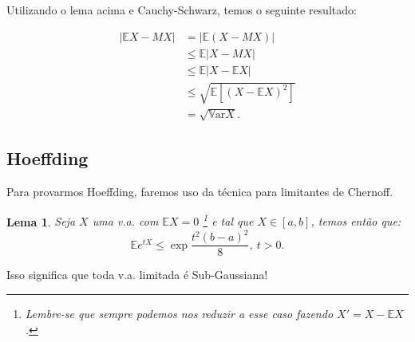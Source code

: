 \documentclass[12pt,a4paper,oneside]{book}
\newtheorem{lemma}[theorem]{Lema}
\theoremstyle{definition}
\theoremstyle{remark}
\numberwithin{equation}{section}
\newcommand{\E}{\mathbb{E}}
\newcommand{\Var}{\mathbb{V}\text{ar}}
\begin{document}
Utilizando o lema acima e Cauchy-Schwarz, temos o seguinte resultado:
\begin{tcolorbox}
\begin{align*}
|\E X- MX| & = |\E(X-MX)|\\
 &\leq \E|X-MX|\\
		&\leq \E |X-\E X| \\
		&\leq \sqrt{\E[(X-\E X)^2]}\\ 
		&= \sqrt{\Var X}.
\end{align*}
\end{tcolorbox}







\subsection{Hoeffding}
Para provarmos Hoeffding, faremos uso da técnica para limitantes de Chernoff.

\begin{lemma}
Seja $X$ uma v.a. com $\E X=0$  \footnote{Lembre-se que sempre podemos nos reduzir a esse caso fazendo $X' = X-\E X$.} e tal que $X\in [a,b]$, temos então que:
$$\E e^{tX} \leq \exp{\dfrac{t^2(b-a)^2}{8}},\ t>0. $$
\end{lemma}

\begin{tcolorbox}[colback = yellow!60]
Isso significa que toda v.a. limitada é Sub-Gaussiana!
\end{tcolorbox}
\end{document}
